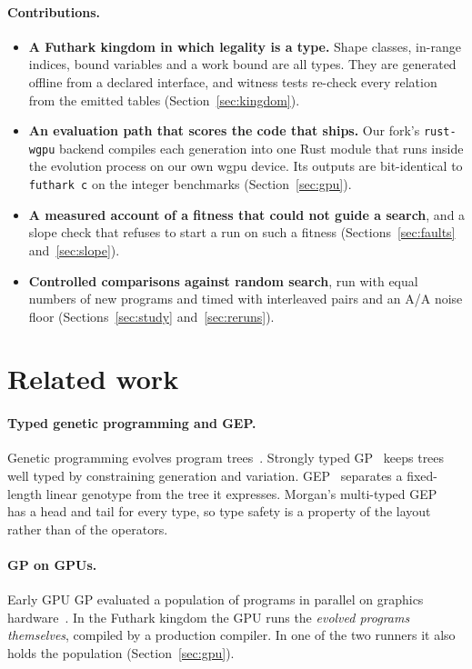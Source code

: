 \documentclass[sigconf,nonacm]{acmart}
\begin{document}
\paragraph{Contributions.}
\begin{itemize}
\item \textbf{A Futhark kingdom in which legality is a type.} Shape classes,
  in-range indices, bound variables and a work bound are all types. They are
  generated offline from a declared interface, and witness tests re-check every
  relation from the emitted tables (Section~\ref{sec:kingdom}).
\item \textbf{An evaluation path that scores the code that ships.} Our fork's
  \texttt{rust-wgpu} backend compiles each generation into one Rust module that
  runs inside the evolution process on our own wgpu device. Its outputs are
  bit-identical to \texttt{futhark c} on the integer benchmarks
  (Section~\ref{sec:gpu}).
\item \textbf{A measured account of a fitness that could not guide a search}, and
  a slope check that refuses to start a run on such a fitness
  (Sections~\ref{sec:faults} and~\ref{sec:slope}).
\item \textbf{Controlled comparisons against random search}, run with equal
  numbers of new programs and timed with interleaved pairs and an A/A noise floor
  (Sections~\ref{sec:study} and~\ref{sec:reruns}).
\end{itemize}

\section{Related work}

\paragraph{Typed genetic programming and GEP.}
Genetic programming evolves program trees~\cite{koza1992gp}. Strongly typed
GP~\cite{montana1995stgp} keeps trees well typed by constraining generation and
variation. GEP~\cite{ferreira2001gep} separates a fixed-length linear genotype
from the tree it expresses. Morgan's multi-typed GEP~\cite{morgan_core} has a
head and tail for every type, so type safety is a property of the layout rather
than of the operators.

\paragraph{GP on GPUs.}
Early GPU GP evaluated a population of programs in parallel on graphics
hardware~\cite{harding2007gpu,chitty2007gpu}. In the Futhark kingdom the GPU
runs the \emph{evolved programs themselves}, compiled by a production compiler.
In one of the two runners it also holds the population (Section~\ref{sec:gpu}).
\end{document}

